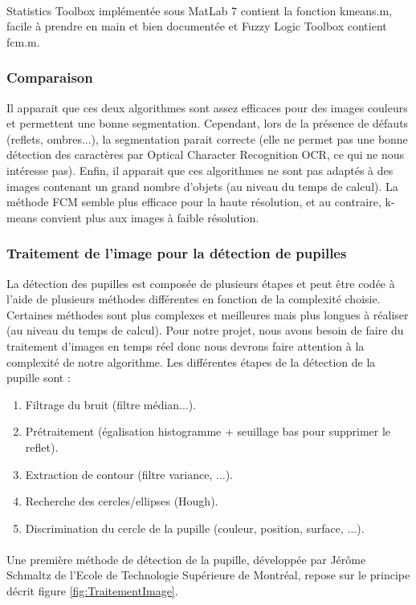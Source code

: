 \paragraph{}
Statistics Toolbox implémentée sous MatLab 7 contient la fonction kmeans.m, facile à prendre en main et bien documentée et Fuzzy Logic Toolbox contient fcm.m.

\subsubsection*{Comparaison}
Il apparait que ces deux algorithmes sont assez efficaces pour des images couleurs et permettent une bonne segmentation. Cependant, lors de la présence de défauts (reflets, ombres...), la segmentation parait correcte (elle ne permet pas une bonne détection des caractères par Optical Character Recognition OCR, ce qui ne nous intéresse pas). Enfin, il apparait que ces algorithmes ne sont pas adaptés à des images contenant un grand nombre d’objets (au niveau du temps de calcul). La méthode FCM semble plus efficace pour la haute résolution, et au contraire, k-means convient plus aux images à faible résolution.

\subsubsection{Traitement de l’image pour la détection de pupilles}

La détection des pupilles est composée de plusieurs étapes et peut être codée à l’aide de plusieurs méthodes différentes en fonction de la complexité choisie. Certaines méthodes sont plus complexes et meilleures mais plus longues à réaliser (au niveau du temps de calcul). Pour notre projet, nous avons besoin de faire du traitement d’images en temps réel donc nous devrons faire attention à la complexité de notre algorithme. Les différentes étapes de la détection de la pupille sont : 
\begin{enumerate}
\item Filtrage du bruit (filtre médian...).
\item Prétraitement (égalisation histogramme + seuillage bas pour supprimer le reflet).
\item Extraction de contour (filtre variance, ...).
\item Recherche des cercles/ellipses (Hough).
\item Discrimination du cercle de la pupille (couleur, position, surface, ...).
\end{enumerate}
\paragraph{}
Une première méthode de détection de la pupille, développée par Jérôme Schmaltz de l’Ecole de Technologie Supérieure de Montréal, repose sur le principe décrit figure \ref{fig:TraitementImage}.


